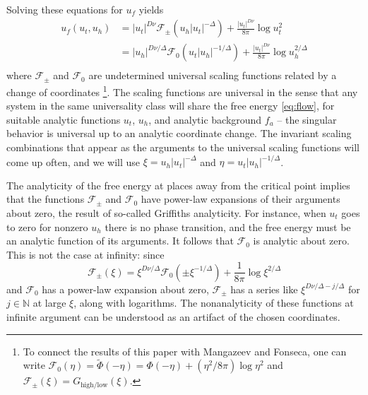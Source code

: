\documentclass[
aps,
pre,
preprint,
longbibliography,
floatfix
]{revtex4-2}
\begin{document}
Solving these equations for $u_f$ yields
\begin{equation}
  \begin{aligned}
    u_f(u_t, u_h)
    &=|u_t|^{D\nu}\mathcal F_\pm(u_h|u_t|^{-\Delta})+\frac{|u_t|^{D\nu}}{8\pi}\log u_t^2 \\
    &=|u_h|^{D\nu/\Delta}\mathcal F_0(u_t|u_h|^{-1/\Delta})+\frac{|u_t|^{D\nu}}{8\pi}\log u_h^{2/\Delta} \\
  \end{aligned}
\end{equation}
where $\mathcal F_\pm$ and $\mathcal F_0$ are undetermined universal scaling functions
related by a change of coordinates \footnote{To connect the results of this
  paper with Mangazeev and Fonseca, one can write $\mathcal
  F_0(\eta)=\tilde\Phi(-\eta)=\Phi(-\eta)+(\eta^2/8\pi) \log \eta^2$ and
$\mathcal F_\pm(\xi)=G_{\mathrm{high}/\mathrm{low}}(\xi)$.}.  The scaling
functions are universal in the sense that any system in the same universality class will share the free energy \eqref{eq:flow}, for suitable analytic functions $u_t$, $u_h$, and analytic background $f_a$ -- the singular behavior is universal up to an analytic coordinate change.
The invariant scaling combinations that appear as the
arguments to the universal scaling functions will come up often, and we will
use $\xi=u_h|u_t|^{-\Delta}$ and $\eta=u_t|u_h|^{-1/\Delta}$.

The analyticity of the free energy at places away from the critical point
implies that the functions $\mathcal F_\pm$ and $\mathcal F_0$ have power-law
expansions of their arguments about zero, the result of so-called Griffiths
analyticity. For instance, when $u_t$ goes to zero for nonzero $u_h$ there is
no phase transition, and the free energy must be an analytic function of its
arguments. It follows that $\mathcal F_0$ is analytic about zero. This is not
the case at infinity: since
\begin{equation}
  \mathcal F_\pm(\xi)
  =\xi^{D\nu/\Delta}\mathcal F_0(\pm \xi^{-1/\Delta})+\frac1{8\pi}\log\xi^{2/\Delta}
\end{equation}
and $\mathcal F_0$ has a power-law expansion about zero, $\mathcal F_\pm$ has a
series like $\xi^{D\nu/\Delta-j/\Delta}$ for $j\in\mathbb N$ at large $\xi$,
along with logarithms. The nonanalyticity of these functions at infinite
argument can be understood as an artifact of the chosen coordinates.
\end{document}
